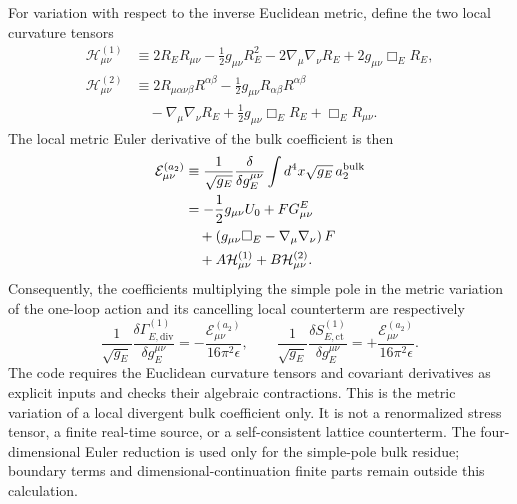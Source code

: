 \documentclass[epj]{svjour}
\begin{document}
For variation with respect to the inverse Euclidean metric, define
the two local curvature tensors
\begin{align}
\mathcal H^{(1)}_{\mu\nu}
&\equiv
2R_E R_{\mu\nu}
-\frac12g_{\mu\nu}R_E^2
-2\nabla_\mu\nabla_\nu R_E
+2g_{\mu\nu}\Box_E R_E,
\label{eq:ptum_scalar_metric_variation_h1}\\
\mathcal H^{(2)}_{\mu\nu}
&\equiv
2R_{\mu\alpha\nu\beta}R^{\alpha\beta}
-\frac12g_{\mu\nu}R_{\alpha\beta}R^{\alpha\beta}
\nonumber\\
&\quad
-\nabla_\mu\nabla_\nu R_E
+\frac12g_{\mu\nu}\Box_E R_E
+\Box_E R_{\mu\nu}.
\label{eq:ptum_scalar_metric_variation_h2}
\end{align}
The local metric Euler derivative of the bulk coefficient is then
\begin{align}
\mathcal E_{\mu\nu}^{(a_2)}
&\equiv
\frac{1}{\sqrt{g_E}}
\frac{\delta}{\delta g_E^{\mu\nu}}
\int d^4x\sqrt{g_E}\,a_2^{\rm bulk}
\nonumber\\
&=
-\frac12g_{\mu\nu}U_0
+F G_{\mu\nu}^{E}
\nonumber\\
&\quad
+\left(g_{\mu\nu}\Box_E-\nabla_\mu\nabla_\nu\right)F
\nonumber\\
&\quad
+A\mathcal H^{(1)}_{\mu\nu}
+B\mathcal H^{(2)}_{\mu\nu}.
\label{eq:ptum_scalar_pole_metric_variation}
\end{align}
Consequently, the coefficients multiplying the simple pole in the
metric variation of the one-loop action and its cancelling local
counterterm are respectively
\begin{equation}
\frac{1}{\sqrt{g_E}}
\frac{\delta\Gamma_{E,\mathrm{div}}^{(1)}}{\delta g_E^{\mu\nu}}
=-\frac{\mathcal E_{\mu\nu}^{(a_2)}}{16\pi^2\epsilon},
\qquad
\frac{1}{\sqrt{g_E}}
\frac{\delta S_{E,\mathrm{ct}}^{(1)}}{\delta g_E^{\mu\nu}}
=+\frac{\mathcal E_{\mu\nu}^{(a_2)}}{16\pi^2\epsilon}.
\end{equation}
The code requires the Euclidean curvature tensors and covariant
derivatives as explicit inputs and checks their algebraic contractions.
This is the metric variation of a local divergent bulk coefficient
only.  It is not a renormalized stress tensor, a finite real-time
source, or a self-consistent lattice counterterm.  The four-dimensional
Euler reduction is used only for the simple-pole bulk residue; boundary
terms and dimensional-continuation finite parts remain outside this
calculation.
\end{document}
